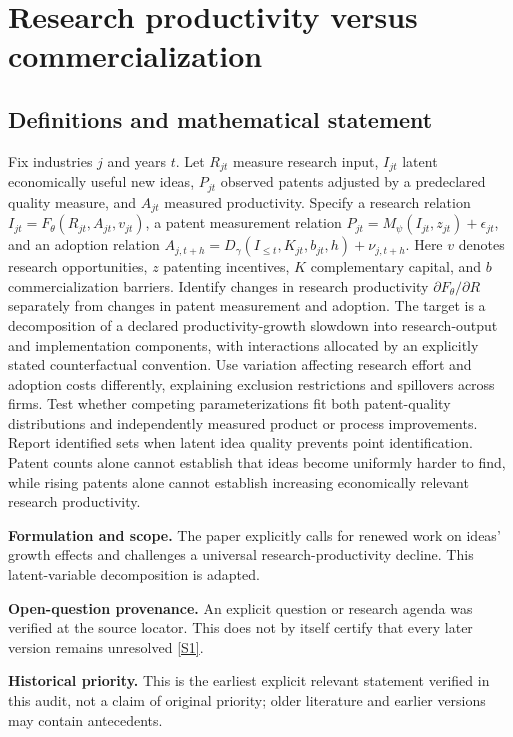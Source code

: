 \documentclass[11pt]{article}
\newcommand{\sref}[2]{\hyperlink{source:#1:#2}{[S#2]}}
\begin{document}
\section*{Research productivity versus commercialization}\label{30007542}
\subsection{Definitions and mathematical statement}
Fix industries \(j\) and years \(t\). Let \(R_{jt}\) measure research input, \(I_{jt}\) latent economically useful new ideas, \(P_{jt}\) observed patents adjusted by a predeclared quality measure, and \(A_{jt}\) measured productivity. Specify a research relation \(I_{jt}=F_\theta(R_{jt},A_{jt},v_{jt})\), a patent measurement relation \(P_{jt}=M_\psi(I_{jt},z_{jt})+\epsilon_{jt}\), and an adoption relation \(A_{j,t+h}=D_\gamma(I_{\le t},K_{jt},b_{jt},h)+\nu_{j,t+h}\). Here \(v\) denotes research opportunities, \(z\) patenting incentives, \(K\) complementary capital, and \(b\) commercialization barriers.
Identify changes in research productivity \(\partial F_\theta/\partial R\) separately from changes in patent measurement and adoption. The target is a decomposition of a declared productivity-growth slowdown into research-output and implementation components, with interactions allocated by an explicitly stated counterfactual convention. Use variation affecting research effort and adoption costs differently, explaining exclusion restrictions and spillovers across firms. Test whether competing parameterizations fit both patent-quality distributions and independently measured product or process improvements. Report identified sets when latent idea quality prevents point identification. Patent counts alone cannot establish that ideas become uniformly harder to find, while rising patents alone cannot establish increasing economically relevant research productivity.

\par\textbf{Formulation and scope.} The paper explicitly calls for renewed work on ideas’ growth effects and challenges a universal research-productivity decline. This latent-variable decomposition is adapted.

\par\textbf{Open-question provenance.} An explicit question or research agenda was verified at the source locator. This does not by itself certify that every later version remains unresolved \sref{30007542}{1}.

\par\textbf{Historical priority.} This is the earliest explicit relevant statement verified in this audit, not a claim of original priority; older literature and earlier versions may contain antecedents.
\end{document}
